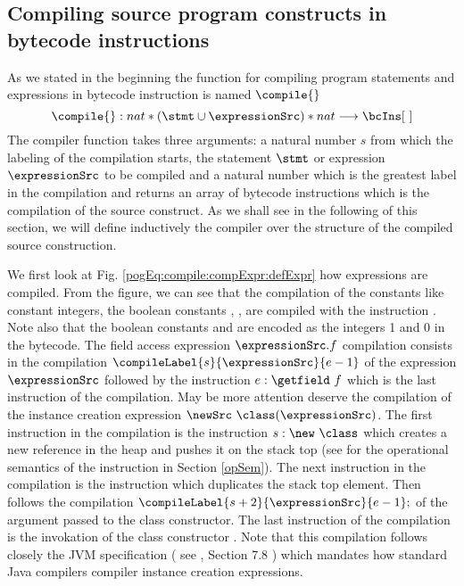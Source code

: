 

\subsection{Compiling source program  constructs in bytecode instructions} \label{pogEq:compile:compExpr} 

As we stated in the beginning the function for compiling program statements and expressions in bytecode instruction is named $\compile{}$
$$ \compile{ } : nat * (\stmt \cup \expressionSrc )* nat \longrightarrow  \bcIns [ \ ]  $$
The compiler function takes three arguments: a natural number $s$ from which the labeling of the compilation starts,
 the statement $\stmt$ or expression $\expressionSrc$  to be compiled and a natural number which is
 the greatest label in the compilation 
and returns an array of bytecode instructions which is the compilation of the source construct.
As we shall see in the following of this section, we will define inductively the compiler over the structure
of the compiled source construction.

We first look at Fig. \ref{pogEq:compile:compExpr:defExpr} how expressions are compiled.
 From the figure, we can see that the compilation of
 the constants like constant integers, the boolean constants
\Mytrue, \Myfalse, \Mynull{}  are compiled with the instruction \push. Note also that the boolean constants  \Mytrue{} and \Myfalse{}
are encoded as the integers 1 and 0 in the bytecode.  The field access expression $ \expressionSrc.f$ compilation consists in the compilation
$\compileLabel{s}{\expressionSrc}{e - 1}$ of the expression   $ \expressionSrc $ followed by the instruction $ e: \getfield  \ f $ which is
 the last instruction of the compilation.  May be more attention deserve the compilation of the instance creation expression
$\newSrc \ \class  (\expressionSrc )$. The first instruction in the compilation is the instruction $s : \new \ \class$ which 
creates a new reference in the heap and pushes it on the stack top 
(see for the operational semantics of the instruction in Section \ref{opSem}). The next instruction in the compilation is the instruction 
\dup which duplicates the stack top element. Then follows the compilation 
$ \compileLabel{s+2}{\expressionSrc}{e - 1 }; $ of the argument passed to the class constructor. The last instruction of the compilation
is the invokation of the class constructor  \Constructor{\class}. Note that this compilation follows closely 
the JVM specification ( see \cite{VMSpec}, Section 7.8 ) which mandates 
how standard Java compilers compiler instance creation expressions.  
  
